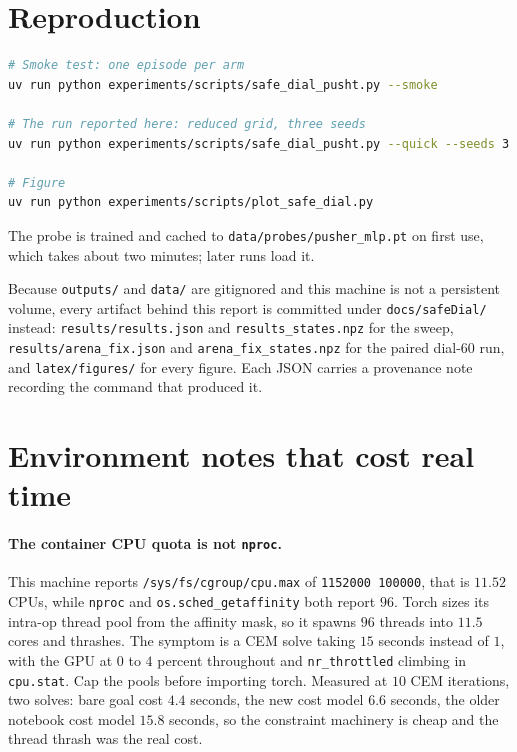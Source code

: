 \documentclass[11pt,a4paper]{article}
\begin{document}
\section{Reproduction}

\begin{lstlisting}[language=bash]
# Smoke test: one episode per arm
uv run python experiments/scripts/safe_dial_pusht.py --smoke

# The run reported here: reduced grid, three seeds
uv run python experiments/scripts/safe_dial_pusht.py --quick --seeds 3

# Figure
uv run python experiments/scripts/plot_safe_dial.py
\end{lstlisting}

The probe is trained and cached to \texttt{data/probes/pusher\_mlp.pt} on first use, which
takes about two minutes; later runs load it.

Because \texttt{outputs/} and \texttt{data/} are gitignored and this machine is not a
persistent volume, every artifact behind this report is committed under
\texttt{docs/safeDial/} instead: \texttt{results/results.json} and
\texttt{results\_states.npz} for the sweep, \texttt{results/arena\_fix.json} and
\texttt{arena\_fix\_states.npz} for the paired dial-60 run, and
\texttt{latex/figures/} for every figure. Each JSON carries a provenance note recording the
command that produced it.

\appendix

\section{Environment notes that cost real time}

\paragraph{The container CPU quota is not \texttt{nproc}.} This machine reports
\texttt{/sys/fs/cgroup/cpu.max} of \texttt{1152000 100000}, that is $11.52$ CPUs, while
\texttt{nproc} and \texttt{os.sched\_getaffinity} both report $96$. Torch sizes its intra-op
thread pool from the affinity mask, so it spawns $96$ threads into $11.5$ cores and thrashes.
The symptom is a CEM solve taking $15$ seconds instead of $1$, with the GPU at $0$ to $4$
percent throughout and \texttt{nr\_throttled} climbing in \texttt{cpu.stat}. Cap the pools
before importing torch. Measured at $10$ CEM iterations, two solves: bare goal cost $4.4$
seconds, the new cost model $6.6$ seconds, the older notebook cost model $15.8$ seconds, so
the constraint machinery is cheap and the thread thrash was the real cost.
\end{document}
